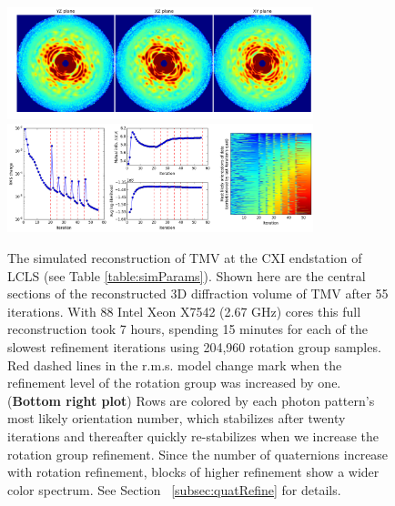 \documentclass[]{iucr}              %
\begin{document}
\begin{figure}
\caption{The simulated reconstruction of TMV at the CXI endstation of LCLS (see Table \ref{table:simParams}). Shown here are the central sections of the reconstructed 3D diffraction volume of TMV after 55 iterations. With 88 Intel Xeon X7542 (2.67 GHz) cores this full reconstruction took 7 hours, spending 15 minutes for each of the slowest refinement iterations using 204,960 rotation group samples. Red dashed lines in the r.m.s. model change mark when the refinement level of the rotation group was increased by one. ({\bf Bottom right plot}) Rows are colored by each photon pattern's most likely orientation number, which stabilizes after twenty iterations and thereafter quickly re-stabilizes when we increase the rotation group refinement. Since the number of quaternions increase with rotation refinement, blocks of higher refinement show a wider color spectrum. See Section ~\ref{subsec:quatRefine} for details.}
\includegraphics[width=3.5in]{figures/cxi_intens_055.png} \label{fig:cxi_intens}
\includegraphics[width=3.5in]{figures/cxi_log_fig.png} \label{fig:cxi_log}
\end{figure}
\end{document}
